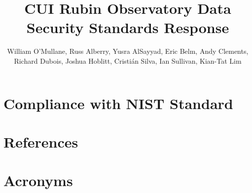 \documentclass[DM,authoryear,toc]{lsstdoc}
\title{CUI Rubin Observatory Data Security Standards  Response}
\author{%
William O'Mullane,
Russ Alberry,
Yusra AlSayyad,
Eric Belm,
Andy Clements,
Richard Dubois,
Joshua Hoblitt,
Cristi\'{a}n Silva,
Ian Sullivan,
Kian-Tat Lim
}
\date{\vcsDate}
\begin{document}
\maketitle



\appendix

\section{Compliance with NIST Standard}\label{sec:compliance}


\section{References} \label{sec:bib}
\renewcommand{\refname}{} %


\section{Acronyms} \label{sec:acronyms}

\end{document}
